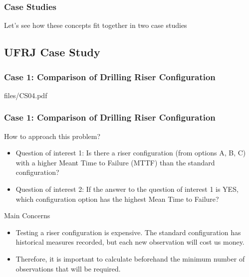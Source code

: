 \documentclass[10pt]{beamer}
\begin{document}
\begin{frame}
  \frametitle{Case Studies}
  Let's see how these concepts fit together in two case studies
\end{frame}

\subsection{UFRJ Case Study}

\begin{frame}
  \frametitle{Case 1: Comparison of Drilling Riser Configuration}
  files/CS04.pdf
\end{frame}

\begin{frame}
  \frametitle{Case 1: Comparison of Drilling Riser Configuration}
  \begin{block}{How to approach this problem?}
    \begin{itemize}
    \item Question of interest 1: Is there a riser configuration (from
      options A, B, C) with a higher Meant Time to Failure (MTTF) than
      the standard configuration?
    \item Question of interest 2: If the answer to the question of
      interest 1 is YES, which configuration option has the highest
      Mean Time to Failure?
    \end{itemize}
  \end{block}
  \begin{block}{Main Concerns}
    \begin{itemize}
    \item Testing a riser configuration is expensive. The standard
      configuration has historical measures recorded, but each new
      observation will cost us money.
    \item Therefore, it is important to calculate beforehand the
      minimum number of observations that will be required.
    \end{itemize}
  \end{block}
\end{frame}
\end{document}
